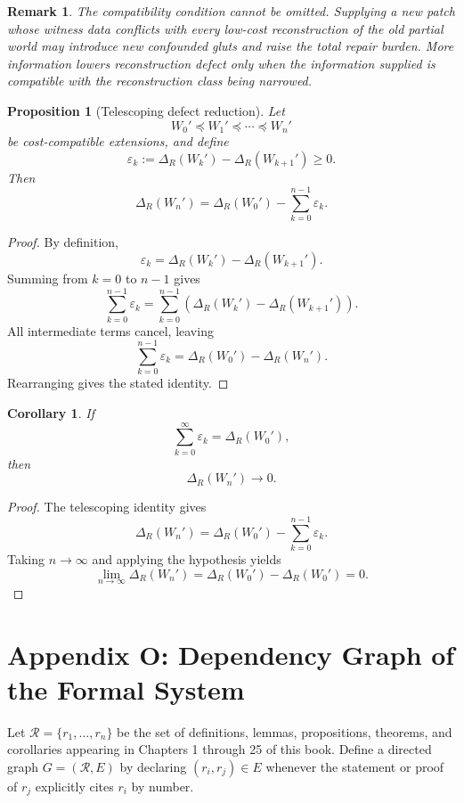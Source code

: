 \documentclass[11pt]{book}
\newtheorem*{appendixproposition}{Proposition}
\newtheorem*{appendixcorollary}{Corollary}
\newtheorem*{appendixremark}{Remark}
\begin{document}
\begin{appendixremark}
The compatibility condition cannot be omitted. Supplying a new patch
whose witness data conflicts with every low-cost reconstruction of the
old partial world may introduce new confounded gluts and raise the total
repair burden. More information lowers reconstruction defect only when
the information supplied is compatible with the reconstruction class
being narrowed.
\end{appendixremark}

\begin{appendixproposition}[Telescoping defect reduction]
Let
\[
W_0'\preceq W_1'\preceq\cdots\preceq W_n'
\]
be cost-compatible extensions, and define
\[
\varepsilon_k
:=
\Delta_R(W_k')-\Delta_R(W_{k+1}')
\geq0.
\]
Then
\[
\Delta_R(W_n')
=
\Delta_R(W_0')
-
\sum_{k=0}^{n-1}\varepsilon_k.
\]
\end{appendixproposition}

\begin{proof}
By definition,
\[
\varepsilon_k
=
\Delta_R(W_k')-\Delta_R(W_{k+1}').
\]
Summing from $k=0$ to $n-1$ gives
\[
\sum_{k=0}^{n-1}\varepsilon_k
=
\sum_{k=0}^{n-1}
\left(
\Delta_R(W_k')-\Delta_R(W_{k+1}')
\right).
\]
All intermediate terms cancel, leaving
\[
\sum_{k=0}^{n-1}\varepsilon_k
=
\Delta_R(W_0')-\Delta_R(W_n').
\]
Rearranging gives the stated identity.
\end{proof}

\begin{appendixcorollary}
If
\[
\sum_{k=0}^{\infty}\varepsilon_k
=
\Delta_R(W_0'),
\]
then
\[
\Delta_R(W_n')\longrightarrow0.
\]
\end{appendixcorollary}

\begin{proof}
The telescoping identity gives
\[
\Delta_R(W_n')
=
\Delta_R(W_0')
-
\sum_{k=0}^{n-1}\varepsilon_k.
\]
Taking $n\to\infty$ and applying the hypothesis yields
\[
\lim_{n\to\infty}\Delta_R(W_n')
=
\Delta_R(W_0')-\Delta_R(W_0')
=
0.
\]
\end{proof}



\chapter*{Appendix O: Dependency Graph of the Formal System}

Let $\mathcal R = \{r_1, \dots, r_n\}$ be the set of definitions, lemmas, propositions, theorems, and corollaries appearing in Chapters 1 through 25 of this book. Define a directed graph $G = (\mathcal R, E)$ by declaring $(r_i, r_j) \in E$ whenever the statement or proof of $r_j$ explicitly cites $r_i$ by number.
\end{document}
